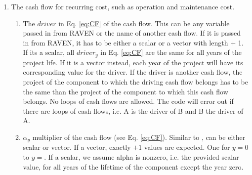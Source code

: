 \begin{enumerate}
\begin{enumerate}
\begin{enumerate}
      \end{enumerate}
    \item[\xmlNode{Recurring}] The cash flow for recurring cost, such as operation and maintenance cost.
      \begin{enumerate}
        \item[\xmlNode{driver}] The $driver$ in Eq. \ref{eq:CF} of the cash flow. This can be any variable passed in from RAVEN or the name
          of another cash flow. If it is passed in from RAVEN, it has to be either a scalar or a vector with length  + 1.
          If its a scalar, all $driver_{y}$ in Eq. \ref{eq:CF}  are the same for all years of the project life. If it is a vector instead, each
          year of the project  will have its corresponding value for the driver. If the driver is another
          cash flow, the project  of the component to which the driving cash flow belongs has to be the same than the project
           of the component to which this
          cash flow belongs. No loops of cash flows are allowed. The code will error out if there are loops of cash flows, i.e. A is the driver
          of B and B the driver of A.
          \item[\xmlNode{alpha}] $\alpha_{y}$ multiplier of the cash flow (see Eq. \ref{eq:CF}). Similar to , can be
            either scalar or vector. If a vector, exactly $ + 1$
            values are expected. One for $y=0$ to $y=$.
            If a scalar, we assume alpha is nonzero, i.e. the provided scalar value, for all years of the lifetime
            of the component except the year zero.
      \end{enumerate}
  \end{enumerate}


\end{enumerate}
